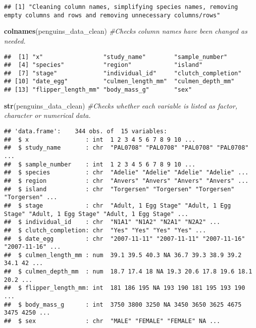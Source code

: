 \documentclass[
]{article}
\newenvironment{Shaded}{\begin{snugshade}}{\end{snugshade}}
\newcommand{\CommentTok}[1]{\textcolor[rgb]{0.56,0.35,0.01}{\textit{#1}}}
\newcommand{\FunctionTok}[1]{\textcolor[rgb]{0.13,0.29,0.53}{\textbf{#1}}}
\newcommand{\NormalTok}[1]{#1}
\begin{document}
\begin{verbatim}
## [1] "Cleaning column names, simplifying species names, removing empty columns and rows and removing unnecessary columns/rows"
\end{verbatim}

\begin{Shaded}
\begin{Highlighting}[]
\FunctionTok{colnames}\NormalTok{(penguins\_data\_clean) }\CommentTok{\#Checks column names have been changed as needed.}
\end{Highlighting}
\end{Shaded}

\begin{verbatim}
##  [1] "x"                 "study_name"        "sample_number"    
##  [4] "species"           "region"            "island"           
##  [7] "stage"             "individual_id"     "clutch_completion"
## [10] "date_egg"          "culmen_length_mm"  "culmen_depth_mm"  
## [13] "flipper_length_mm" "body_mass_g"       "sex"
\end{verbatim}

\begin{Shaded}
\begin{Highlighting}[]
\FunctionTok{str}\NormalTok{(penguins\_data\_clean) }\CommentTok{\#Checks whether each variable is listed as factor, character or numerical data.}
\end{Highlighting}
\end{Shaded}

\begin{verbatim}
## 'data.frame':    344 obs. of  15 variables:
##  $ x                : int  1 2 3 4 5 6 7 8 9 10 ...
##  $ study_name       : chr  "PAL0708" "PAL0708" "PAL0708" "PAL0708" ...
##  $ sample_number    : int  1 2 3 4 5 6 7 8 9 10 ...
##  $ species          : chr  "Adelie" "Adelie" "Adelie" "Adelie" ...
##  $ region           : chr  "Anvers" "Anvers" "Anvers" "Anvers" ...
##  $ island           : chr  "Torgersen" "Torgersen" "Torgersen" "Torgersen" ...
##  $ stage            : chr  "Adult, 1 Egg Stage" "Adult, 1 Egg Stage" "Adult, 1 Egg Stage" "Adult, 1 Egg Stage" ...
##  $ individual_id    : chr  "N1A1" "N1A2" "N2A1" "N2A2" ...
##  $ clutch_completion: chr  "Yes" "Yes" "Yes" "Yes" ...
##  $ date_egg         : chr  "2007-11-11" "2007-11-11" "2007-11-16" "2007-11-16" ...
##  $ culmen_length_mm : num  39.1 39.5 40.3 NA 36.7 39.3 38.9 39.2 34.1 42 ...
##  $ culmen_depth_mm  : num  18.7 17.4 18 NA 19.3 20.6 17.8 19.6 18.1 20.2 ...
##  $ flipper_length_mm: int  181 186 195 NA 193 190 181 195 193 190 ...
##  $ body_mass_g      : int  3750 3800 3250 NA 3450 3650 3625 4675 3475 4250 ...
##  $ sex              : chr  "MALE" "FEMALE" "FEMALE" NA ...
\end{verbatim}
\end{document}
